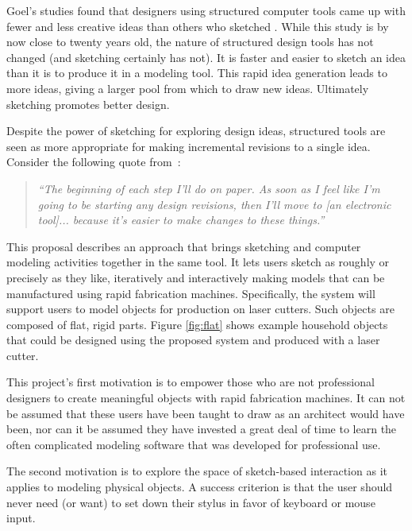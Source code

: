 \documentclass[12pt]{article}
\begin{document}
Goel's studies found that designers using structured computer tools
came up with fewer and less creative ideas than others who sketched
\cite{goel-sketches-of-thought}. While this study is by now close to
twenty years old, the nature of structured design tools has not
changed (and sketching certainly has not). It is faster and easier to
sketch an idea than it is to produce it in a modeling tool. This rapid
idea generation leads to more ideas, giving a larger pool from which
to draw new ideas. Ultimately sketching promotes better design.

Despite the power of sketching for exploring design ideas, structured
tools are seen as more appropriate for making incremental revisions to
a single idea. Consider the following quote
from~\cite{newman-web-designers}:

\begin{quotation}
\textit{``The beginning of each step I'll do on paper. As soon as I feel
  like I'm going to be starting any design revisions, then I'll move
  to [an electronic tool]... because it's easier to make changes to
  these things.''}
\end{quotation}

This proposal describes an approach that brings sketching and computer
modeling activities together in the same tool. It lets users sketch as
roughly or precisely as they like, iteratively and interactively
making models that can be manufactured using rapid fabrication
machines. Specifically, the system will support users to model objects
for production on laser cutters. Such objects are composed of flat,
rigid parts. Figure \ref{fig:flat} shows example household objects
that could be designed using the proposed system and produced with a
laser cutter.

This project's first motivation is to empower those who are not
professional designers to create meaningful objects with rapid
fabrication machines. It can not be assumed that these users have been
taught to draw as an architect would have been, nor can it be assumed
they have invested a great deal of time to learn the often complicated
modeling software that was developed for professional use. 

The second motivation is to explore the space of sketch-based
interaction as it applies to modeling physical objects. A success
criterion is that the user should never need (or want) to set down
their stylus in favor of keyboard or mouse input.
\end{document}
